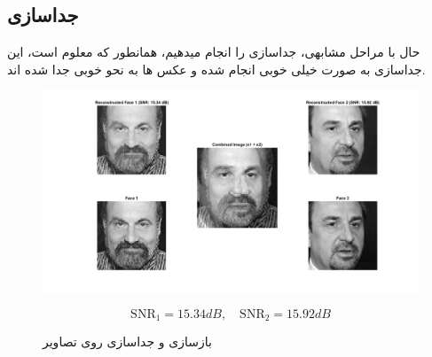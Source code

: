 \subsection{جداسازی}

حال با مراحل مشابهی، جداسازی را انجام میدهیم، همانطور که معلوم است، این جداسازی به صورت خیلی خوبی انجام شده و عکس ها
به نحو خوبی جدا شده اند.

\begin{figure}[h!]
	\centering
	\includegraphics*[width=\linewidth]{../results/bss_faces.png}
	\vspace*{-4em}
	\caption{بازسازی و جداسازی روی تصاویر}
    \vspace*{-1em}
	\[
		\text{SNR}_1 = 15.34dB,\quad \text{SNR}_2=15.92dB
	\]
\end{figure}